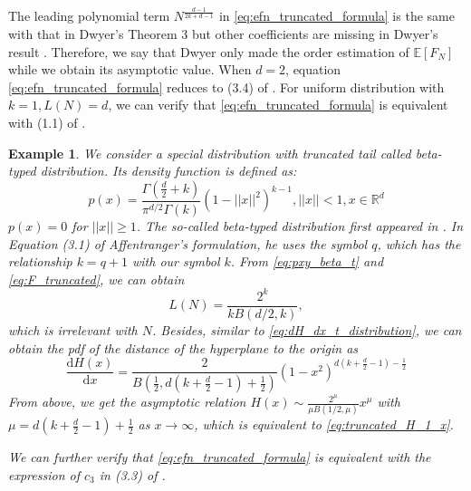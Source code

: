 \documentclass[conference,a4paper]{IEEEtran}
\def\E{\mathbb{E}}
\def\dd{\mathrm{d}}
\newtheorem{example}{Example}
\begin{document}
 The leading polynomial term $N^{\frac{d-1}{2k+d-1}}$ in \eqref{eq:efn_truncated_formula}
 is the same with that in Dwyer's Theorem 3
 but other coefficients are missing in Dwyer's result
 \cite{dwyer1991convex}. Therefore, we say that Dwyer only made the order estimation
 of $\E[F_N]$ while we obtain its asymptotic value.
 When $d=2$, equation \eqref{eq:efn_truncated_formula} reduces to (3.4) of \cite{carnal1970konvexe}.
 For uniform distribution with $k=1, L(N)=d$, we can verify that
 \eqref{eq:efn_truncated_formula} is equivalent with (1.1)
 of \cite{raynaud1970enveloppe}.
 \begin{example}\label{ex:beta_typed}
  We consider a special distribution with truncated tail called
  beta-typed distribution. Its density function is defined as:
  \begin{equation}\label{eq:pxy_beta_t}
    p(x) = \frac{\Gamma(\frac{d}{2}+ k)}{\pi^{d/2} \Gamma(k)} (1-||x||^2)^{k-1},
    ||x|| <1, x \in \mathbb{R}^d
\end{equation}
 $p(x)=0$ for $||x||\geq 1$.
 The so-called beta-typed distribution first appeared in \cite{affentranger1991convex}.
 In Equation (3.1) of Affentranger's formulation,
 he uses the symbol $q$, which has the relationship  $k=q+1$ with our symbol $k$.
 From \eqref{eq:pxy_beta_t} and \eqref{eq:F_truncated}, we can obtain
 \begin{equation}\label{eq:beta_typed_L_N}
  L(N)=\frac{2^k}{kB(d/2,k)},
 \end{equation}
 which is irrelevant with $N$.
 Besides, similar to \eqref{eq:dH_dx_t_distribution},
 we can obtain the pdf of the distance of the hyperplane to the origin as
\begin{equation}
     \frac{\dd H(x)}{\dd x} = \frac{2}{B(\frac{1}{2}, d(k+\frac{d}{2}-1)+\frac{1}{2})}\left(1 -x^2\right)^{d(k+\frac{d}{2}-1)-\frac{1}{2}} 
\end{equation}
From above, we get the asymptotic relation $H(x) \sim \frac{2^{\mu}}{\mu B(1/2, \mu)}
x^{\mu}$ with $\mu=d(k+\frac{d}{2}-1)+\frac{1}{2}$ as $x\to \infty$,
which is equivalent to \eqref{eq:truncated_H_1_x}.

 We can further verify that
 \eqref{eq:efn_truncated_formula} is equivalent with the expression of $c_3$
 in (3.3) of \cite{affentranger1991convex}.
 \end{example}
\end{document}
